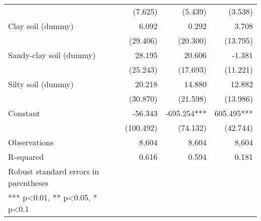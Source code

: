 \documentclass[
]{article}
\begin{document}
\begin{longtable}[t]{lrrr}
 & (7.625) & (5.439) & (3.538)\\
\addlinespace
Clay soil (dummy) & 6.092 & 0.292 & 3.708\\
 & (29.406) & (20.300) & (13.795)\\
Sandy-clay soil (dummy) & 28.195 & 20.606 & -1.381\\
 & (25.243) & (17.693) & (11.221)\\
Silty soil (dummy) & 20.218 & 14.880 & 12.882\\
\addlinespace
 & (30.870) & (21.598) & (13.986)\\
Constant & -56.343 & -695.254*** & 605.495***\\
 & (100.492) & (74.132) & (42.744)\\
Observations & 8,604 & 8,604 & 8,604\\
R-squared & 0.616 & 0.594 & 0.181\\
\addlinespace
Robust standard errors in parentheses &  &  & \\
*** p<0.01, ** p<0.05, * p<0.1 &  &  & \\*
\end{longtable}
\endgroup{}

\newpage

\begingroup\fontsize{7}{9}\selectfont
\end{document}
